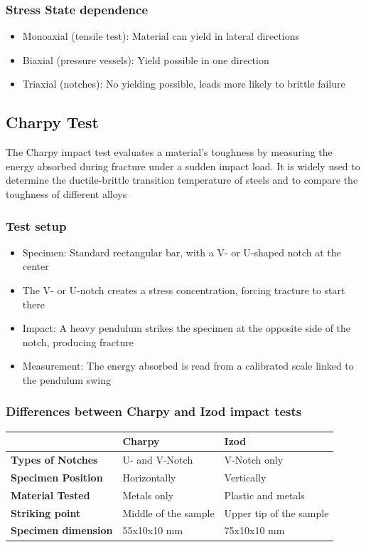 \documentclass{article}
\begin{document}
\subsubsection{Stress State dependence}
\begin{itemize}
  \item Monoaxial (tensile test): Material can yield in lateral directions
  \item Biaxial (pressure vessels): Yield possible in one direction
  \item Triaxial (notches): No yielding possible, leads more likely to brittle failure
\end{itemize}

\subsection{Charpy Test}
The Charpy impact test evaluates a material's toughness by measuring the energy absorbed
during fracture under a sudden impact load. It is widely used to determine the
ductile-brittle transition temperature of steels and to compare the toughness of different
alloys

\subsubsection{Test setup}
\begin{itemize}
  \item Specimen: Standard rectangular bar, with a V- or U-shaped notch at the center
  \item The V- or U-notch creates a stress concentration, forcing tracture to start there
  \item Impact: A heavy pendulum strikes the specimen at the opposite side of the notch, producing fracture
  \item Measurement: The energy absorbed is read from a calibrated scale linked to the pendulum swing
\end{itemize}

\subsubsection{Differences between Charpy and Izod impact tests}
\begin{table}[h!]
  \centering
  \begin{tabular}{|l|l|l|}
    \hline
    & \textbf{Charpy} & \textbf{Izod}\\
    \hline
    \textbf{Types of Notches} & U- and V-Notch & V-Notch only\\
    \hline
    \textbf{Specimen Position} & Horizontally & Vertically\\
    \hline
    \textbf{Material Tested} & Metals only & Plastic and metals\\
    \hline
    \textbf{Striking point} & Middle of the sample & Upper tip of the sample\\
    \hline
    \textbf{Specimen dimension} & 55x10x10 mm & 75x10x10 mm\\
    \hline
  \end{tabular}
\end{table}
\end{document}
